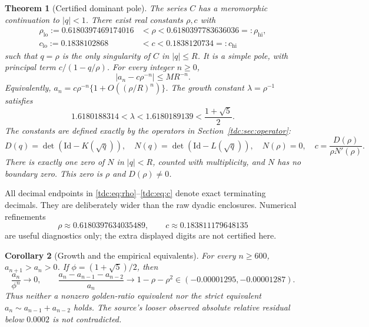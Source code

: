 \documentclass[11pt]{article}
\newtheorem{theorem}{Theorem}[section]
\newtheorem{corollary}[theorem]{Corollary}
\theoremstyle{definition}\newtheorem{definition}[theorem]{Definition}
\theoremstyle{remark}\newtheorem{remark}[theorem]{Remark}
\newcommand{\Id}{\mathrm{Id}}
\newcommand{\rhol}{\rho_{\mathrm{lo}}}
\newcommand{\rhoh}{\rho_{\mathrm{hi}}}
\newcommand{\cl}{c_{\mathrm{lo}}}
\newcommand{\ch}{c_{\mathrm{hi}}}
\begin{document}
\begin{theorem}[Certified dominant pole]\label{tdc:thm:main}
The series $C$ has a meromorphic continuation to $|q|<1$. There exist real constants $\rho,c$ with
\begin{align}
 \rhol:=0.6180397469174016&<\rho<0.6180397783636036=:\rhoh,
 \label{tdc:eq:rho}\\
 \cl:=0.1838102868&<c<0.1838120734=:\ch
 \label{tdc:eq:c}
\end{align}
such that $q=\rho$ is the only singularity of $C$ in $|q|\le R$. It is a simple pole, with principal term $c/(1-q/\rho)$. For every integer $n\ge0$,
\begin{equation}\label{tdc:eq:error}
 \left|a_n-c\rho^{-n}\right|\le MR^{-n}.
\end{equation}
Equivalently, $a_n=c\rho^{-n}\{1+O((\rho/R)^n)\}$. The growth constant $\lambda=\rho^{-1}$ satisfies
\begin{equation}\label{tdc:eq:lambda}
 1.6180188314<\lambda<1.6180189139<\frac{1+\sqrt5}{2}.
\end{equation}
The constants are defined exactly by the operators in Section~\ref{tdc:sec:operator}:
\begin{equation}\label{tdc:eq:exactconstants}
 D(q)=\det(\Id-K(\sqrt q)),\quad N(q)=\det(\Id-L(\sqrt q)),
 \quad N(\rho)=0,\quad c=\frac{D(\rho)}{\rho N'(\rho)}.
\end{equation}
There is exactly one zero of $N$ in $|q|<R$, counted with multiplicity, and $N$ has no boundary zero. This zero is $\rho$ and $D(\rho)\ne0$.
\end{theorem}

All decimal endpoints in \eqref{tdc:eq:rho}--\eqref{tdc:eq:c} denote exact terminating decimals. They are deliberately wider than the raw dyadic enclosures. Numerical refinements
\[
 \rho\approx0.6180397634035489,\qquad c\approx0.183811179648135
\]
are useful diagnostics only; the extra displayed digits are not certified here.

\begin{corollary}[Growth and the empirical equivalents]\label{tdc:cor:empirical}
For every $n\ge600$, $a_{n+1}>a_n>0$. If $\phi=(1+\sqrt5)/2$, then
\begin{equation}\label{tdc:eq:empirical}
 \frac{a_n}{\phi^n}\longrightarrow0,\qquad
 \frac{a_n-a_{n-1}-a_{n-2}}{a_n}\longrightarrow1-\rho-\rho^2
 \in(-0.00001295,-0.00001287).
\end{equation}
Thus neither a nonzero golden-ratio equivalent nor the strict equivalent
$a_n\sim a_{n-1}+a_{n-2}$ holds. The source's looser observed absolute relative residual below $0.0002$ is not contradicted.
\end{corollary}
\end{document}
